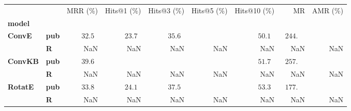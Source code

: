 \begin{tabular}{llrrrrrrr}
\toprule
       &   &           MRR (\%) &        Hits@1 (\%) &        Hits@3 (\%) & Hits@5 (\%) &       Hits@10 (\%) &                             MR & AMR (\%) \\
\textbf{model} & {} &                    &                    &                    &             &                    &                                &          \\
\midrule
\textbf{ConvE} & \textbf{pub} &  $32.5\phantom{0}$ &  $23.7\phantom{0}$ &  $35.6\phantom{0}$ &             &  $50.1\phantom{0}$ &  $\phantom{0}244.\phantom{00}$ &          \\
       & \textbf{R} &                NaN &                NaN &                NaN &         NaN &                NaN &                            NaN &      NaN \\\midrule
\textbf{ConvKB} & \textbf{pub} &  $39.6\phantom{0}$ &                    &                    &             &  $51.7\phantom{0}$ &  $\phantom{0}257.\phantom{00}$ &          \\
       & \textbf{R} &                NaN &                NaN &                NaN &         NaN &                NaN &                            NaN &      NaN \\\midrule
\textbf{RotatE} & \textbf{pub} &  $33.8\phantom{0}$ &  $24.1\phantom{0}$ &  $37.5\phantom{0}$ &             &  $53.3\phantom{0}$ &  $\phantom{0}177.\phantom{00}$ &          \\
       & \textbf{R} &                NaN &                NaN &                NaN &         NaN &                NaN &                            NaN &      NaN \\
\bottomrule
\end{tabular}

